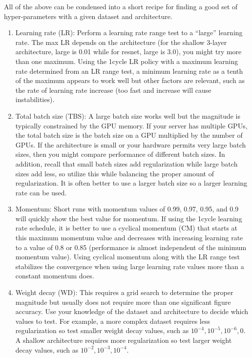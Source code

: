\documentclass{article} %
\begin{document}
All of the above can be condensed into a short recipe for finding a good set of hyper-parameters with a given dataset and architecture.
\begin{enumerate}
	\item Learning rate (LR): Perform a learning rate range test to a ``large'' learning rate.  The max LR depends on the architecture (for the shallow 3-layer architecture, large is 0.01 while for resnet, large is 3.0), you might try more than one maximum.  Using the 1cycle LR policy with a maximum learning rate determined from an LR range test, a minimum learning rate as a tenth of the maximum appears to work well but other factors are relevant, such as the rate of learning rate increase (too fast and increase will cause instabilities).
	\item Total batch size (TBS): A large batch size works well but the magnitude is typically constrained by the GPU memory.  If your server has multiple GPUs, the total batch size is the batch size on a GPU multiplied by the number of GPUs.  If the architecture is small or your hardware permits very large batch sizes, then you might compare performance of different batch sizes.  In addition, recall that small batch sizes add regularization while large batch sizes add less, so utilize this while balancing the proper amount of regularization.  It is often better to use a larger batch size so a larger learning rate can be used.
	\item Momentum: Short runs with momentum values of 0.99, 0.97, 0.95, and 0.9 will quickly show the best value for momentum.  If using the 1cycle learning rate schedule, it is better to use a cyclical momentum (CM) that starts at this maximum momentum value and decreases with increasing learning rate to a value of 0.8 or 0.85 (performance is almost independent of the minimum momentum value).  Using cyclical momentum along with the LR range test stabilizes the convergence when using large learning rate values more than a constant momentum does.
	\item Weight decay (WD): This requires a grid search to determine the proper magnitude but usually does not require more than one significant figure accuracy.  Use your knowledge of the dataset and architecture to decide which values to test.  For example, a more complex dataset requires less regularization so test smaller weight decay values, such as $10^{-4}, 10^{-5}, 10^{-6}, 0$.  A shallow architecture requires more regularization  so test larger weight decay values, such as $10^{-2}, 10^{-3}, 10^{-4}$.
\end{enumerate}  
\end{document}
